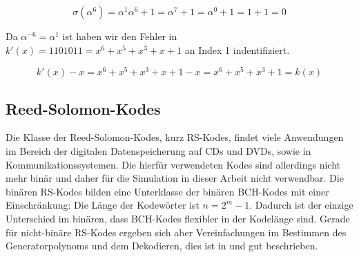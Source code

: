 $$\sigma(\alpha^6) = \alpha^1\alpha^6 +1 = \alpha^7 +1 = \alpha^0 + 1 = 1 + 1 = 0$$

Da $\alpha^{-6} = \alpha^1$ ist haben wir den Fehler in $k'(x) = 1101011 = x^6 + x^5 + x^3 + x+1$ an Index 1 indentifiziert.

$$k'(x) - x = x^6 + x^5 + x^3 + x+1 -x = x^6+x^5+x^3+1=k(x)$$



\subsection{Reed-Solomon-Kodes}

Die Klasse der Reed-Solomon-Kodes, kurz RS-Kodes, findet viele Anwendungen im Bereich der digitalen Datenspeicherung auf CDs und DVDs, sowie in Kommunikationssystemen.\cite[Kap. 4]{morelos2006art} Die hierfür verwendeten Kodes sind allerdings nicht mehr binär und daher für die Simulation in dieser Arbeit nicht verwendbar. Die binären RS-Kodes bilden eine Unterklasse der binären BCH-Kodes mit einer Einschränkung: Die Länge der Kodewörter ist $n = 2^m-1$.\cite[Kap 5.2]{huffman2010fundamentals} Dadurch ist der einzige Unterschied im binären, dass BCH-Kodes flexibler in der Kodelänge sind. Gerade für nicht-binäre RS-Kodes ergeben sich aber Vereinfachungen im Bestimmen des Generatorpolynoms und dem Dekodieren, dies ist in \cite[Kap. 4]{morelos2006art} und \cite[Kap. 5.2]{huffman2010fundamentals} gut beschrieben.
